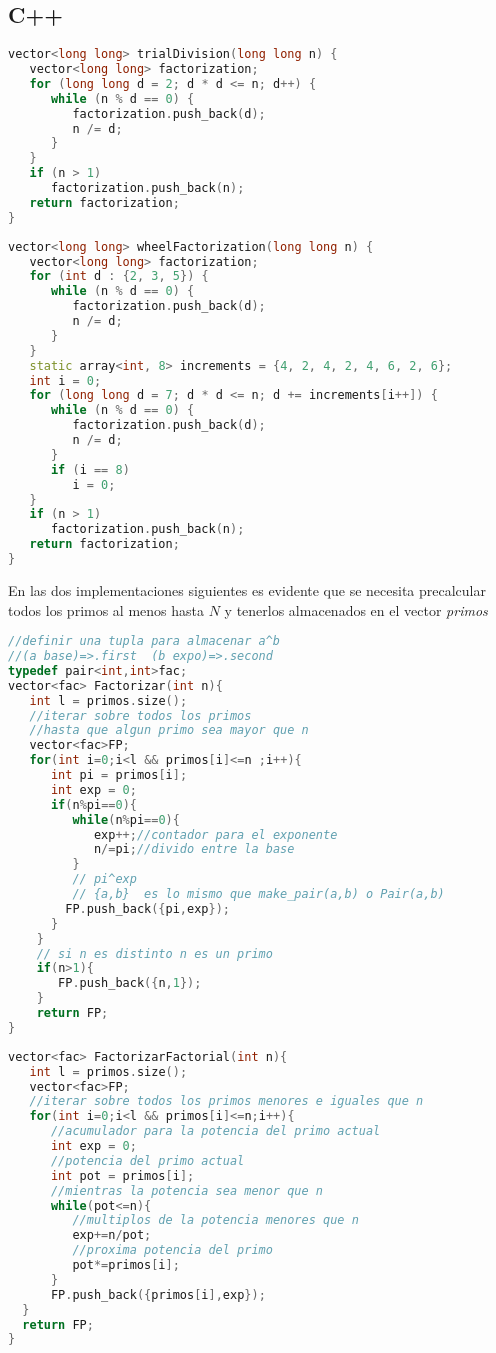 \subsection{C++}
\begin{lstlisting}[language=C++]
vector<long long> trialDivision(long long n) {
   vector<long long> factorization;
   for (long long d = 2; d * d <= n; d++) {
      while (n % d == 0) {
         factorization.push_back(d);
         n /= d;
      }
   }
   if (n > 1)
      factorization.push_back(n);
   return factorization;
}
\end{lstlisting}

\begin{lstlisting}[language=C++]
vector<long long> wheelFactorization(long long n) {
   vector<long long> factorization;
   for (int d : {2, 3, 5}) {
      while (n % d == 0) {
         factorization.push_back(d);
         n /= d;
      }
   }
   static array<int, 8> increments = {4, 2, 4, 2, 4, 6, 2, 6};
   int i = 0;
   for (long long d = 7; d * d <= n; d += increments[i++]) {
      while (n % d == 0) {
         factorization.push_back(d);
         n /= d;
      }
      if (i == 8)
         i = 0;
   }
   if (n > 1)
      factorization.push_back(n);
   return factorization;
}
\end{lstlisting}

En las dos implementaciones siguientes es evidente que se necesita precalcular todos los primos al menos hasta $N$ y tenerlos almacenados en el vector \emph{primos}

\begin{lstlisting}[language=C++]
//definir una tupla para almacenar a^b 
//(a base)=>.first  (b expo)=>.second
typedef pair<int,int>fac;
vector<fac> Factorizar(int n){
   int l = primos.size();
   //iterar sobre todos los primos
   //hasta que algun primo sea mayor que n
   vector<fac>FP;
   for(int i=0;i<l && primos[i]<=n ;i++){
      int pi = primos[i];
      int exp = 0;
      if(n%pi==0){
         while(n%pi==0){
            exp++;//contador para el exponente
            n/=pi;//divido entre la base
         }
         // pi^exp
         // {a,b}  es lo mismo que make_pair(a,b) o Pair(a,b)
        FP.push_back({pi,exp});
      }
    }
    // si n es distinto n es un primo
    if(n>1){
	   FP.push_back({n,1});
    }
    return FP;
}
\end{lstlisting}

\begin{lstlisting}[language=C++]
vector<fac> FactorizarFactorial(int n){
   int l = primos.size();
   vector<fac>FP;
   //iterar sobre todos los primos menores e iguales que n
   for(int i=0;i<l && primos[i]<=n;i++){
      //acumulador para la potencia del primo actual
      int exp = 0;
      //potencia del primo actual
      int pot = primos[i];
      //mientras la potencia sea menor que n
      while(pot<=n){
         //multiplos de la potencia menores que n
         exp+=n/pot;
         //proxima potencia del primo
         pot*=primos[i];
      }
      FP.push_back({primos[i],exp});
  }
  return FP;
}
\end{lstlisting}

